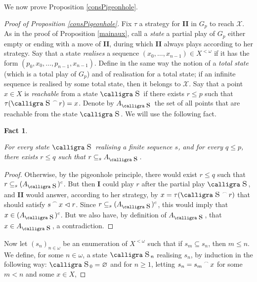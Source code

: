 \documentclass[a4paper,11pt]{article}
\newtheorem{fact}[thm]{Fact}
\theoremstyle{definition}
\numberwithin{equation}{section}
\newcommand{\X}{\mathcal{X}}
\newcommand{\I}{\textbf{I}}
\newcommand{\II}{\textbf{II}}
\newcommand{\st}{\text{{\calligra \LARGE s}}\,}
\newcommand{\Ast}{A_{\text{{\calligra \Large s}}\,}}
\newcommand{\concat}{%
  \mathbin{\raisebox{1ex}{\scalebox{.7}{$\frown$}}}%
}
\begin{document}
\smallskip

We now prove Proposition \ref{consPigeonhole}.

\begin{proof}[Proof of Proposition \ref{consPigeonhole}]

Fix $\tau$ a strategy for \II{} in $G_p$ to reach $\X$. As in the proof of Proposition \ref{mainaux}, call a \emph{state} a partial play of $G_p$ either empty or ending with a move of \II{}, during which \II{} always plays according to her strategy. Say that a state \emph{realises} a sequence $(x_0, \ldots, x_{n - 1}) \in X^{< \omega}$ if it has the form $(p_0, x_0, \ldots, p_{n - 1}, x_{n - 1})$. Define in the same way the notion of a \emph{total state} (which is a total play of $G_p$) and of realisation for a total state; if an infinite sequence is realised by some total state, then it belongs to $\X$. Say that a point $x \in X$ is \emph{reachable} from a state $\st$ if there exists $r \leqslant p$ such that $\tau(\st \concat r) = x$. Denote by $\Ast$ the set of all points that are reachable from the state \nolinebreak $\st$. We will use the following fact.

\begin{fact}\label{factdeuxonze}

For every state $\st$ realising a finite sequence $s$, and for every $q \leqslant p$, there exists $r \leqslant q$ such that $r \subseteq_s \Ast$.

\end{fact}

\begin{proof}

Otherwise, by the pigeonhole principle, there would exist $r \leqslant q$ such that $r \subseteq_s (\Ast)^c$. But then \I{} could play $r$ after the partial play $\st$, and \II{} would answer, according to her strategy, by $x = \tau(\st \concat r)$ that should satisfy $s \concat x \vartriangleleft r$. Since $r \subseteq_s (\Ast)^c$, this would imply that $x \in (\Ast)^c$. But we also have, by definition of $\Ast$, that $x \in \Ast$, a contradiction.

\end{proof}

Now let $(s_n)_{n \in \omega}$ be an enumeration of $X^{< \omega}$ such that if $s_m \subseteq s_n$, then $m \leqslant n$. We define, for some $n \in \omega$, a state $\st_n$ realising $s_n$, by induction in the following way: $\st_0 = \varnothing$ and for $n \geqslant 1$, letting $s_n = s_m \concat x$ for some $m < n$ and some $x \in X$,


\end{proof}
\end{document}
